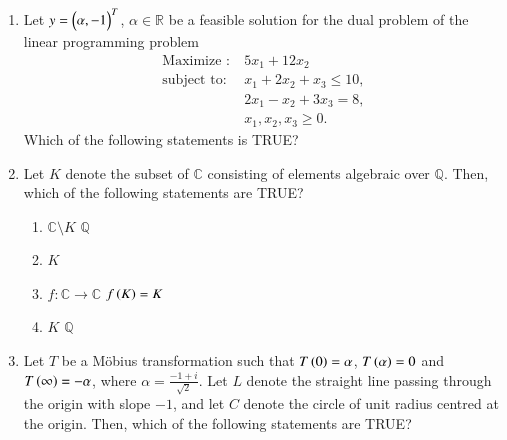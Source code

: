 \documentclass[journal,12pt,onecolumn]{IEEEtran}
\theoremstyle{remark}
\begin{document}
\begin{enumerate}
\item Let $y = \begin{pmatrix}\alpha,-1\end{pmatrix}^{T}$, $\alpha \in \mathbb{R}$ be a feasible solution for the dual problem of the linear programming problem
\begin{align*}
\text{Maximize }:~ &5x_{1} + 12x_{2} \\
\text{subject to} : 
~&x_{1} + 2x_{2} + x_{3} \le 10, \\
& 2x_{1} - x_{2} + 3x_{3} = 8, \\
& x_{1}, x_{2}, x_{3} \ge 0.
\end{align*}
Which of the following statements is TRUE?

\hfill{}

\begin{enumerate}
\end{enumerate}

\item Let $K$ denote the subset of $\mathbb{C}$ consisting of elements algebraic over $\mathbb{Q}$. Then, which of the following statements are TRUE?

\hfill{}

\begin{enumerate}
\item {} $\mathbb{C}\setminus K$  $\mathbb{Q}$
\item $K$ 
\item {} $f \colon \mathbb{C} \to \mathbb{C}$ $f\left(K\right) = K$
\item {} $K$  $\mathbb{Q}$
\end{enumerate}

\item Let $T$ be a Möbius transformation such that $T\left(0\right) = \alpha$, $T\left(\alpha\right) = 0$ and $T\left(\infty\right) = -\alpha$, where $\alpha = \frac{-1 + i}{\sqrt{2}}$. Let $L$ denote the straight line passing through the origin with slope $-1$, and let $C$ denote the circle of unit radius centred at the origin. Then, which of the following statements are TRUE?


\end{enumerate}
\end{document}
